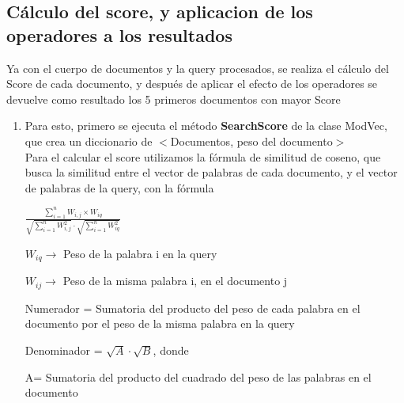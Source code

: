 \documentclass[12pt, a4paper]{article}
\begin{document}
                        \subsection{Cálculo del score, y aplicacion de los operadores a los resultados}
                        Ya con el cuerpo de documentos y la query procesados, se realiza
                        el cálculo del Score de cada documento, y después de aplicar el efecto de los
                        operadores se devuelve como resultado los 5 primeros documentos con mayor Score
                        
                        \begin{enumerate}      
                  \item Para esto, primero se ejecuta el método \textbf{SearchScore} 
                        de la clase ModVec,
                        que crea un diccionario de $<$Documentos, peso del documento$>$\\
                        Para el calcular el score utilizamos la fórmula de similitud de coseno, que busca la similitud
                        entre el vector de palabras de cada documento, y el vector de palabras de la query,
                        con la fórmula
                        \quad
                        {
                        \vspace{0.1cm}
                        \begin{center}
                              {\LARGE$\frac{\sum_{i=1}^{n} W_{i,j} \times W_{iq}}{\sqrt{\sum_{i=1}^{n} W_{i,j}^2}  \cdot  \sqrt{\sum_{i=1}^{n} W_{iq}^2}}$}
                        \end{center}
                        \vspace{0.5cm}
                        }
                        \quad

                        $W_{iq} \rightarrow$ Peso de la palabra i en la query

                        $W_{ij} \rightarrow$ Peso de la misma palabra i, en el documento j
                        
                
                        Numerador = Sumatoria del producto del peso de cada palabra en el documento
                        por el peso de la misma palabra en la query
 
                        Denominador = $\sqrt{A} \cdot \sqrt{B}$, donde 
                        
                        A= Sumatoria del producto del cuadrado del peso de las palabras
                        en el documento
                        

\end{enumerate}
\end{document}
